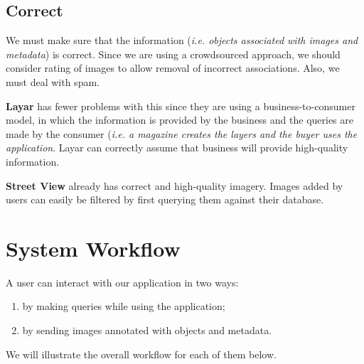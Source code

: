 \documentclass[a4paper,onecolumn,oneside,titlepage,12pt]{report}
\begin{document}
\section*{Correct}
We must make sure that the information (\emph{i.e. objects associated with images and metadata}) is correct. Since we are using a crowdsourced approach, we should consider rating of images to allow removal of incorrect associations. Also, we must deal with spam.

\textbf{Layar} has fewer problems with this since they are using a business-to-consumer model, in which the information is provided by the business and the queries are made by the consumer (\emph{i.e. a magazine creates the layers and the buyer uses the application}. Layar can correctly assume that business will provide high-quality information.

\textbf{Street View} already has correct and high-quality imagery. Images added by users can easily be filtered by first querying them against their database.

\chapter{System Workflow}
A user can interact with our application in two ways:
\begin{enumerate}
	\item by making queries while using the application;
	\item by sending images annotated with objects and metadata.
\end{enumerate}
We will illustrate the overall workflow for each of them below.
\end{document}
